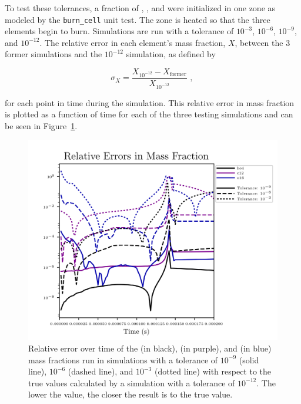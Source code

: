 \documentclass[preprint]{aastex62}
\begin{document}
     
      To test these tolerances, a fraction of  , , and  were initialized in one zone as modeled by the {\tt burn\_cell} unit test. The zone is heated so that the three elements begin to burn. Simulations are run with a tolerance of $10^{-3}$, $10^{-6}$, $10^{-9}$, and $10^{-12}$. The relative error in each element's mass fraction, $X$, between the 3 former simulations and the $10^{-12}$ simulation, as defined by 
    
      \begin{equation}
        \sigma_X = \frac{X_{10^{-12}} - X_{\text{former}}}{X_{10^{-12}}} \text{    , }
        \label{eq:relativeerror}
      \end{equation}
    
      for each point in time during the simulation. This relative error in mass fraction is plotted as a function of time for each of the three testing simulations and can be seen in Figure~\ref{fig:relativeerror}.
    
      \begin{figure}
        \centering
        \includegraphics[width=5in]{images/react_aprox13_test13_ureca_tol-rel_xn1.png}
        \caption{Relative error over time of the  (in black),  (in purple), and  (in blue) mass fractions run in simulations with a tolerance of $10^{-9}$ (solid line), $10^{-6}$ (dashed line), and $10^{-3}$ (dotted line) with respect to the true values calculated by a simulation with a tolerance of $10^{-12}$. The lower the value, the closer the result is to the true value. %
          }
        \label{fig:relativeerror}
      \end{figure}  
  
\end{document}
